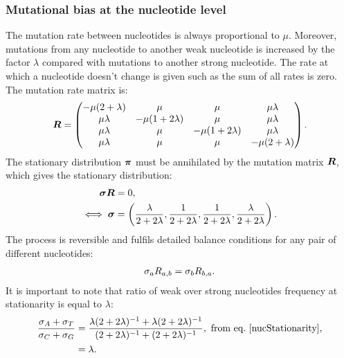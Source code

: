 \subsubsection{Mutational bias at the nucleotide level}
\label{sec:mut-bias-mut-matrix}
The mutation rate between nucleotides is always proportional to $\mu$.
Moreover, mutations from any nucleotide to another weak nucleotide is increased by the factor $\lambda$ compared with mutations to another strong nucleotide.
The rate at which a nucleotide doesn't change is given such as the sum of all rates is zero.
The mutation rate matrix is:
\begin{equation}
    \label{nucMatrix}
    \bm{R} =
    \begin{pmatrix}
    {-\mu(2 + \lambda)}
        & {\mu} & {\mu} & {\mu \lambda} \\
        {\mu \lambda} & {-\mu(1 + 2\lambda)} & {\mu} & {\mu \lambda} \\
        {\mu \lambda} & {\mu} & {-\mu(1 + 2\lambda)} & {\mu \lambda} \\
        {\mu \lambda} & {\mu} & {\mu} & {-\mu(2 + \lambda)}
    \end{pmatrix}.
\end{equation}
The stationary distribution $ \bm{\pi}$ must be annihilated by the mutation matrix $\bm{R}$, which gives the stationary distribution:
\begin{align}
    \bm{\sigma} \bm{R} & = 0, \\
    \iff \bm{\sigma} & = \left( \dfrac{\lambda}{2+2\lambda}, \dfrac{1}{2+2\lambda}, \dfrac{1}{2+2\lambda}, \dfrac{\lambda}{2+2\lambda} \right).
    \label{nucStationarity}
\end{align}
The process is reversible and fulfils detailed balance conditions for any pair of different nucleotides:
\begin{align}
    \sigma_a R_{a, b} =\sigma_b R_{b, a}.
    \label{nucMutBalance}
\end{align}
It is important to note that ratio of weak over strong nucleotides frequency at stationarity is equal to $\lambda$:
\begin{align}
    \label{lambda}
    \dfrac{ \mutequi_A + \mutequi_T }{ \mutequi_C + \mutequi_G }
    & = \dfrac{ \lambda ( 2 + 2 \lambda)^{-1} + \lambda ( 2 + 2 \lambda)^{-1}}{ ( 2 + 2 \lambda)^{-1} + ( 2 + 2 \lambda)^{-1}}, \ \text{from eq.~\ref{nucStationarity},}\\
    & = \lambda.
\end{align}

